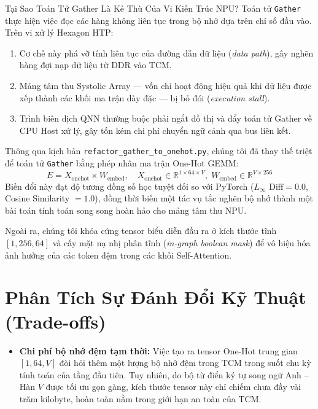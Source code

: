 \documentclass[11pt,a4paper,oneside,table]{report}
\begin{document}
\begin{technicalbox}{Tại Sao Toán Tử Gather Là Kẻ Thù Của Vi Kiến Trúc NPU?}
Toán tử \texttt{Gather} thực hiện việc đọc các hàng không liên tục trong bộ nhớ dựa trên chỉ số đầu vào. Trên vi xử lý Hexagon HTP:
\begin{enumerate}
    \item Cơ chế này phá vỡ tính liên tục của đường dẫn dữ liệu (\textit{data path}), gây nghẽn hàng đợi nạp dữ liệu từ DDR vào TCM.
    \item Mảng tâm thu Systolic Array --- vốn chỉ hoạt động hiệu quả khi dữ liệu được xếp thành các khối ma trận dày đặc --- bị bỏ đói (\textit{execution stall}).
    \item Trình biên dịch QNN thường buộc phải ngắt đồ thị và đẩy toán tử Gather về CPU Host xử lý, gây tốn kém chi phí chuyển ngữ cảnh qua bus liên kết.
\end{enumerate}
\end{technicalbox}

Thông qua kịch bản \texttt{refactor\_gather\_to\_onehot.py}, chúng tôi đã thay thế triệt để toán tử \texttt{Gather} bằng phép nhân ma trận One-Hot GEMM:
\begin{equation}
    E = X_{\text{onehot}} \times W_{\text{embed}}, \quad X_{\text{onehot}} \in \mathbb{R}^{1 \times 64 \times V}, \; W_{\text{embed}} \in \mathbb{R}^{V \times 256}
\end{equation}
Biến đổi này đạt độ tương đồng số học tuyệt đối so với PyTorch ($L_\infty \text{ Diff} = 0.0$, Cosine Similarity $= 1.0$), đồng thời biến một tác vụ tắc nghẽn bộ nhớ thành một bài toán tính toán song song hoàn hảo cho mảng tâm thu NPU.

Ngoài ra, chúng tôi khóa cứng tensor biểu diễn đầu ra ở kích thước tĩnh $[1, 256, 64]$ và cấy mặt nạ nhị phân tĩnh (\textit{in-graph boolean mask}) để vô hiệu hóa ảnh hưởng của các token đệm trong các khối Self-Attention.

\section{Phân Tích Sự Đánh Đổi Kỹ Thuật (Trade-offs)}
\begin{itemize}
    \item \textbf{Chi phí bộ nhớ đệm tạm thời:} Việc tạo ra tensor One-Hot trung gian $[1, 64, V]$ đòi hỏi thêm một lượng bộ nhớ đệm trong TCM trong suốt chu kỳ tính toán của tầng đầu tiên. Tuy nhiên, do bộ từ điển ký tự song ngữ Anh -- Hàn $V$ được tối ưu gọn gàng, kích thước tensor này chỉ chiếm chưa đầy vài trăm kilobyte, hoàn toàn nằm trong giới hạn an toàn của TCM.
\end{itemize}
\end{document}
